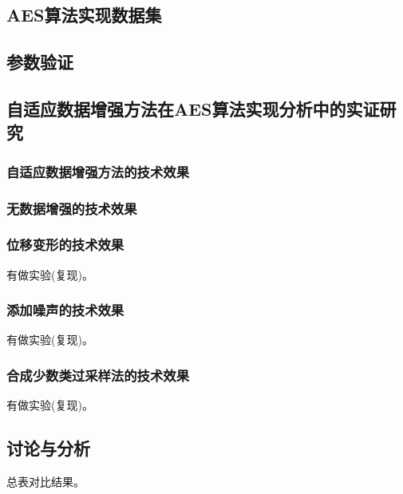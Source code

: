 {	\subsection{AES算法实现数据集}
	\subsection{参数验证}
	\subsection{自适应数据增强方法在AES算法实现分析中的实证研究}
	\subsubsection{自适应数据增强方法的技术效果}
	\subsubsection{无数据增强的技术效果}
	\subsubsection{位移变形的技术效果}
	有做实验(复现)。
	\subsubsection{添加噪声的技术效果}
	有做实验(复现)。
	\subsubsection{合成少数类过采样法的技术效果}
	有做实验(复现)。
	\subsection{讨论与分析}
	总表对比结果。
}